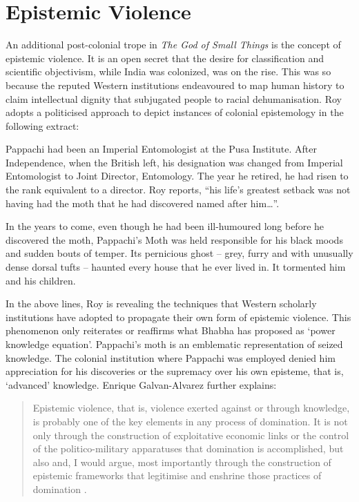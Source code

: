 \section{Epistemic Violence}

An additional post-colonial trope in \emph{The God of Small Things} is the concept of epistemic violence. It is an open secret that the desire for classification and scientific objectivism, while India was colonized, was on the rise. This was so because the reputed Western institutions endeavoured to map human history to claim intellectual dignity that subjugated people to racial dehumanisation. Roy adopts a politicised approach to depict instances of colonial epistemology in the following extract:

Pappachi had been an Imperial Entomologist at the Pusa Institute. After Independence, when the British left, his designation was changed from Imperial Entomologist to Joint Director, Entomology. The year he retired, he had risen to the rank equivalent to a director. Roy reports, ``his life's greatest setback was not having had the moth that he had discovered named after him\ldots''. \parencite[47]{Roy1997}

In the years to come, even though he had been ill-humoured long before he discovered the moth, Pappachi's Moth was held responsible for his black moods and sudden bouts of temper. Its pernicious ghost – grey, furry and with unusually dense dorsal tufts – haunted every house that he ever lived in. It tormented him and his children. \parencite[49]{Roy1997} 

In the above lines, Roy is revealing the techniques that Western scholarly institutions have adopted to propagate their own form of epistemic violence. This phenomenon only reiterates or reaffirms what Bhabha has proposed as `power knowledge equation'. Pappachi's moth is an emblematic representation of seized knowledge. The colonial institution where Pappachi was employed denied him appreciation for his discoveries or the supremacy over his own episteme, that is, `advanced' knowledge. Enrique Galvan-Alvarez further explains: 

\begin{quote}
  Epistemic violence, that is, violence exerted against or through knowledge, is probably one of the key elements in any process of domination. It is not only through the construction of exploitative economic links or the control of the politico-military apparatuses that domination is accomplished, but also and, I would argue, most importantly through the construction of epistemic frameworks that legitimise and enshrine those practices of domination \parencite[11–-26]{Alvarez2010}. 
\end{quote}

